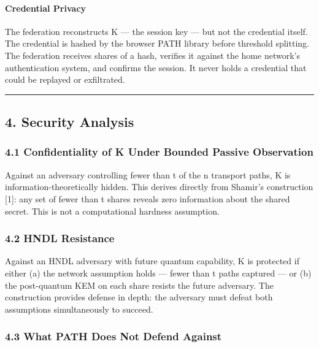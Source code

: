 \documentclass[
  11pt,
]{article}
\begin{document}
\hypertarget{credential-privacy}{%
\paragraph{Credential Privacy}\label{credential-privacy}}

The federation reconstructs K --- the session key --- but not the
credential itself. The credential is hashed by the browser PATH library
before threshold splitting. The federation receives shares of a hash,
verifies it against the home network's authentication system, and
confirms the session. It never holds a credential that could be replayed
or exfiltrated.

\begin{center}\rule{0.5\linewidth}{0.5pt}\end{center}

\hypertarget{security-analysis}{%
\subsection{4. Security Analysis}\label{security-analysis}}

\hypertarget{confidentiality-of-k-under-bounded-passive-observation}{%
\subsubsection{4.1 Confidentiality of K Under Bounded Passive
Observation}\label{confidentiality-of-k-under-bounded-passive-observation}}

Against an adversary controlling fewer than t of the n transport paths,
K is information-theoretically hidden. This derives directly from
Shamir's construction {[}1{]}: any set of fewer than t shares reveals
zero information about the shared secret. This is not a computational
hardness assumption.

\hypertarget{hndl-resistance}{%
\subsubsection{4.2 HNDL Resistance}\label{hndl-resistance}}

Against an HNDL adversary with future quantum capability, K is protected
if either (a) the network assumption holds --- fewer than t paths
captured --- or (b) the post-quantum KEM on each share resists the
future adversary. The construction provides defense in depth: the
adversary must defeat both assumptions simultaneously to succeed.

\hypertarget{what-path-does-not-defend-against}{%
\subsubsection{4.3 What PATH Does Not Defend
Against}\label{what-path-does-not-defend-against}}
\end{document}
